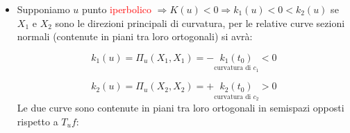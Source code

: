 \begin{osservazione}
\begin{itemize}
            Poiché $k_1(u)$ e $k_2(u)$ sono minimo e massimo della funzione curvatura normale, allora
            \[
            \forall X \in T_{u}f \quad \norm{X} = 1 \quad \Pi_{u}(X,X) > 0
            \]
            $\Rightarrow$ localmente le curve sezioni normali in $u$ si trovano nello stesso semispazio individuato da $T_{u}f$.

            \item Supponiamo $u$ punto \textcolor{red}{iperbolico} $\Rightarrow K(u) < 0 \Rightarrow k_1(u) < 0 < k_2(u)$
            se $X_1$ e $X_2$ sono le direzioni principali di curvatura, per le relative curve sezioni normali (contenute in piani tra loro ortogonali) si avrà:

            \begin{center}
            \end{center}
            \[
            k_1(u) = \Pi_{u}(X_1, X_1) = -\underset{\text{curvatura di } c_1}{k_1(t_0)} < 0
            \]

            \begin{center}
            \end{center}
            \[
            k_2(u) = \Pi_{u}(X_2, X_2) = +\underset{\text{curvatura di } c_2}{k_2(t_0)} > 0
            \]
            Le due curve sono contenute in piani tra loro ortogonali in semispazi opposti rispetto a $T_{u}f$:


\end{itemize}
\end{osservazione}
